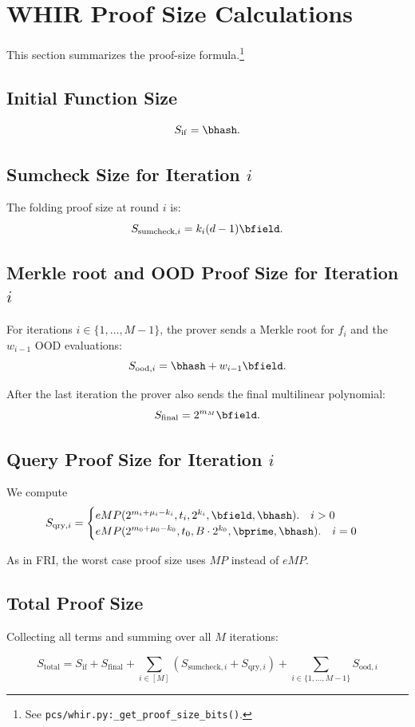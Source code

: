 \section{WHIR Proof Size Calculations}

This section summarizes the proof-size formula.\footnote{See \texttt{pcs/whir.py:\_get\_proof\_size\_bits()}.}

\subsection{Initial Function  Size}
\[
  S_{\mathrm{if}} = \bhash.
\]

\subsection{Sumcheck Size for Iteration \texorpdfstring{\(i\)}{i}}


The folding proof size at round $i$ is:
\[
  S_{\mathrm{sumcheck},i} = k_i(d-1)\bfield.
\]

\subsection{Merkle root and OOD Proof Size for Iteration \texorpdfstring{\(i\)}{i}}

For iterations \(i\in\{1,\ldots,M-1\}\), the prover sends a Merkle root for $f_i$ and the $w_{i-1}$ OOD evaluations:
\[
  S_{\mathrm{ood},i}
    = \bhash+w_{i-1}\bfield.
\]

After the last iteration the prover also sends the final multilinear polynomial:
$$
S_{\mathrm{final}}=2^{m_M}\bfield.
$$

\subsection{Query Proof Size for Iteration \texorpdfstring{\(i\)}{i}}


We compute
\[
  S_{\mathrm{qry},i}
    =\begin{cases}  eMP(2^{m_i+\mu_i-k_i},t_i,2^{k_i},\bfield,\bhash).\quad i>0\\
     eMP(2^{m_0+\mu_0-k_0},t_0, B\cdot 2^{k_0},\bprime,\bhash).\quad i=0
    \end{cases}
\]

As in FRI, the worst case proof size uses $MP$ instead of $eMP$.


\subsection{Total Proof Size}

Collecting all terms and summing over all \(M\) iterations:

\[
\boxed{
S_{\mathrm{total}}
  = S_{\mathrm{if}} + S_{\mathrm{final}}
    + \sum_{i\in[M]} \left( S_{\mathrm{sumcheck},i} + S_{\mathrm{qry},i} \right)
    + \sum_{i\in\{1,\ldots,M-1\}} S_{\mathrm{ood},i}
}
\]

